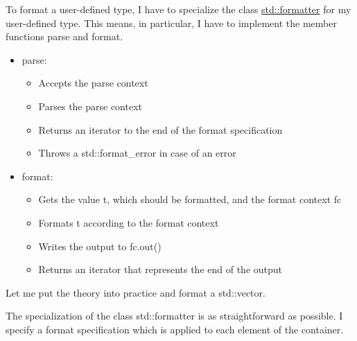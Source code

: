 
To format a user-defined type, I have to specialize the class \href{https://en.cppreference.com/w/cpp/utility/format/formatter}{std::formatter} for my user-defined type. This means, in particular, I have to implement the member functions parse and format.

\begin{itemize}
\item 
parse:

\begin{itemize}
\item 
Accepts the parse context

\item 
Parses the parse context

\item 
Returns an iterator to the end of the format specification

\item 
Throws a std::format\_error in case of an error
\end{itemize}

\item 
format:

\begin{itemize}
\item 
Gets the value t, which should be formatted, and the format context fc

\item 
Formats t according to the format context

\item 
Writes the output to fc.out()

\item 
Returns an iterator that represents the end of the output
\end{itemize}

\end{itemize}

Let me put the theory into practice and format a std::vector.


The specialization of the class std::formatter is as straightforward as possible. I specify a format specification which is applied to each element of the container.

